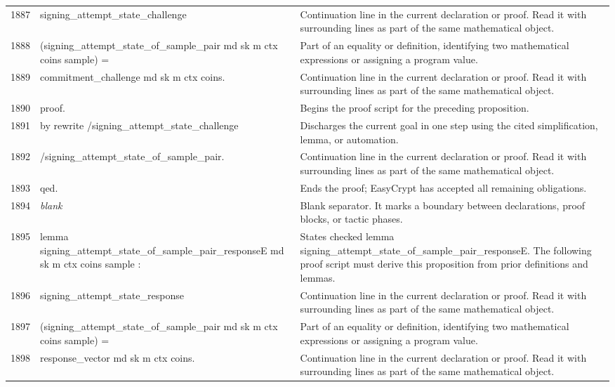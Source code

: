 \documentclass[10pt]{article}
\begin{document}
\begin{longtable}{r L{0.53\textwidth} L{0.37\textwidth}}
1887 & {\ttfamily\scriptsize   signing\_attempt\_state\_challenge} & Continuation line in the current declaration or proof.  Read it with surrounding lines as part of the same mathematical object. \\
1888 & {\ttfamily\scriptsize     (signing\_attempt\_state\_of\_sample\_pair md sk m ctx coins sample) =} & Part of an equality or definition, identifying two mathematical expressions or assigning a program value. \\
1889 & {\ttfamily\scriptsize   commitment\_challenge md sk m ctx coins.} & Continuation line in the current declaration or proof.  Read it with surrounding lines as part of the same mathematical object. \\
1890 & {\ttfamily\scriptsize proof.} & Begins the proof script for the preceding proposition. \\
1891 & {\ttfamily\scriptsize by rewrite /signing\_attempt\_state\_challenge} & Discharges the current goal in one step using the cited simplification, lemma, or automation. \\
1892 & {\ttfamily\scriptsize            /signing\_attempt\_state\_of\_sample\_pair.} & Continuation line in the current declaration or proof.  Read it with surrounding lines as part of the same mathematical object. \\
1893 & {\ttfamily\scriptsize qed.} & Ends the proof; EasyCrypt has accepted all remaining obligations. \\
1894 & {\ttfamily\scriptsize \emph{blank}} & Blank separator.  It marks a boundary between declarations, proof blocks, or tactic phases. \\
1895 & {\ttfamily\scriptsize lemma signing\_attempt\_state\_of\_sample\_pair\_responseE md sk m ctx coins sample :} & States checked lemma signing\_attempt\_state\_of\_sample\_pair\_responseE.  The following proof script must derive this proposition from prior definitions and lemmas. \\
1896 & {\ttfamily\scriptsize   signing\_attempt\_state\_response} & Continuation line in the current declaration or proof.  Read it with surrounding lines as part of the same mathematical object. \\
1897 & {\ttfamily\scriptsize     (signing\_attempt\_state\_of\_sample\_pair md sk m ctx coins sample) =} & Part of an equality or definition, identifying two mathematical expressions or assigning a program value. \\
1898 & {\ttfamily\scriptsize   response\_vector md sk m ctx coins.} & Continuation line in the current declaration or proof.  Read it with surrounding lines as part of the same mathematical object. \\

\end{longtable}
\end{document}
